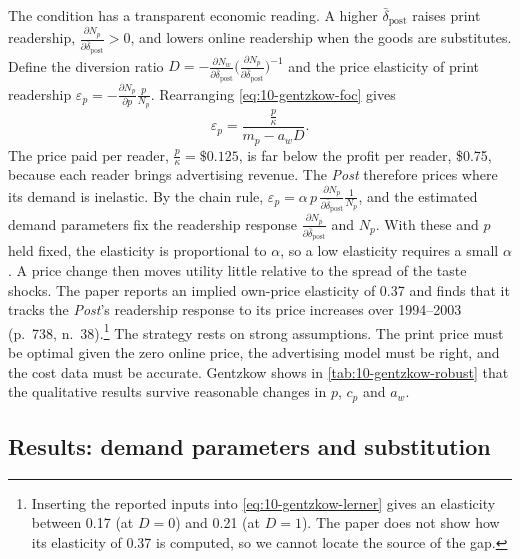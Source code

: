 The condition has a transparent economic reading. A higher $\bar\delta_{\mathrm{post}}$ raises print readership,
$\frac{\partial N_p}{\partial\bar\delta_{\mathrm{post}}} > 0$, and lowers online readership when the goods are
substitutes. Define the diversion ratio $D = -\frac{\partial N_w}{\partial\bar\delta_{\mathrm{post}}}
\bigl(\frac{\partial N_p}{\partial\bar\delta_{\mathrm{post}}}\bigr)^{-1}$ and the price elasticity of print readership $\varepsilon_p = -\frac{\partial
N_p}{\partial p}\frac{p}{N_p}$. Rearranging \eqref{eq:10-gentzkow-foc} gives
\begin{equation}\label{eq:10-gentzkow-lerner}
  \varepsilon_p = \frac{\frac{p}{\kappa}}{m_p - a_w D} .
\end{equation}
The price paid per reader, $\frac{p}{\kappa} = \$0.125$, is far below the profit per reader, \$0.75, because each reader
brings advertising revenue. The \textit{Post} therefore prices where its demand is inelastic. By the chain rule,
$\varepsilon_p = \alpha\,p\,\frac{\partial N_p}{\partial\bar\delta_{\mathrm{post}}}\frac{1}{N_p}$, and the estimated
demand parameters fix the readership response $\frac{\partial N_p}{\partial\bar\delta_{\mathrm{post}}}$ and $N_p$. With
these and $p$ held fixed, the elasticity is proportional to $\alpha$, so a low elasticity requires a small $\alpha$.
A price change then moves utility little relative to the spread of the taste shocks. The paper reports an implied own-price elasticity of
0.37 and finds that it tracks the \textit{Post}'s readership response to its price increases over 1994--2003 (p.~738,
n.~38).\footnote{Inserting the reported inputs into \eqref{eq:10-gentzkow-lerner} gives an elasticity between 0.17 (at
$D = 0$) and 0.21 (at $D = 1$). The paper does not show how its elasticity of 0.37 is computed, so we cannot locate the
source of the gap.}
The strategy rests on strong assumptions. The print price must be optimal given the zero online price, the advertising
model must be right, and the cost data must be accurate. Gentzkow shows in \cref{tab:10-gentzkow-robust} that the
qualitative results survive reasonable changes in $p$, $c_p$ and $a_w$.

\subsection{Results: demand parameters and substitution}\label{sec:10-gentzkow-results}

